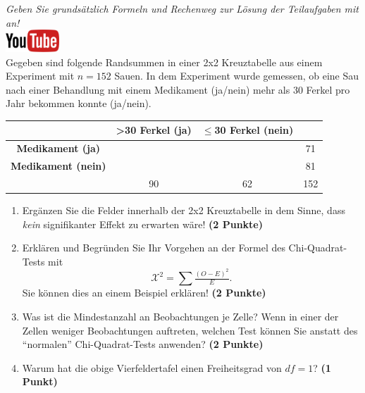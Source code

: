 \documentclass[a4paper, 9pt]{scrartcl}\usepackage[]{graphicx}\usepackage[]{xcolor}
\begin{document}
\textit{Geben Sie grunds{\"a}tzlich Formeln und Rechenweg zur L{\"o}sung der
  Teilaufgaben mit an!} \\[1Ex]

\hfill\href{https://youtu.be/jakM7fHyZfU}{\includegraphics[width =
  2cm]{img/youtube}}\\[1Ex]




Gegeben sind folgende Randsummen in einer 2x2 Kreuztabelle aus einem
Experiment mit $n = 152$ Sauen. In dem Experiment wurde gemessen,
ob eine Sau nach einer Behandlung mit einem Medikament (ja/nein)
mehr als 30 Ferkel pro Jahr bekommen konnte (ja/nein).

\vspace{5Ex}

\begin{center}
  \Large
  \begin{tabular}{c|c|c|c}
     & \textbf{>30 Ferkel (ja)} & \textbf{$\leq$30 Ferkel (nein)} &  \strut\\
    \hline
    \textbf{Medikament (ja)} & \phantom{100}  & \phantom{100}  &   71  \strut\\
    \hline
    \textbf{Medikament (nein)} & \phantom{100}  & \phantom{100}  &   81   \strut\\
    \hline
     &  90 &  62 &  152  \strut\\
  \end{tabular}
\end{center}



\vspace{5Ex}

\begin{enumerate}
\item Erg{\"a}nzen Sie die Felder innerhalb der 2x2 Kreuztabelle in dem Sinne,
  dass \textit{kein} signifikanter Effekt zu erwarten w{\"a}re!
  \textbf{(2 Punkte)}
\item Erkl{\"a}ren und Begr{\"u}nden Sie Ihr Vorgehen an der Formel des
  Chi-Quadrat-Tests mit
  \begin{equation*}
  \mathcal{X}^2 = \sum\tfrac{(O - E)^2}{E}.  
  \end{equation*}
  Sie k{\"o}nnen dies an einem Beispiel erkl{\"a}ren! \textbf{(2 Punkte)}
\item Was ist die Mindestanzahl an Beobachtungen je Zelle? Wenn in einer
  der Zellen weniger Beobachtungen auftreten, welchen Test k{\"o}nnen Sie
  anstatt des "`normalen"' Chi-Quadrat-Tests anwenden? \textbf{(2 Punkte)}
\item Warum hat die obige Vierfeldertafel einen Freiheitsgrad von $df=1$?
  \textbf{(1 Punkt)}
\end{enumerate} 
\clearpage
\end{document}
